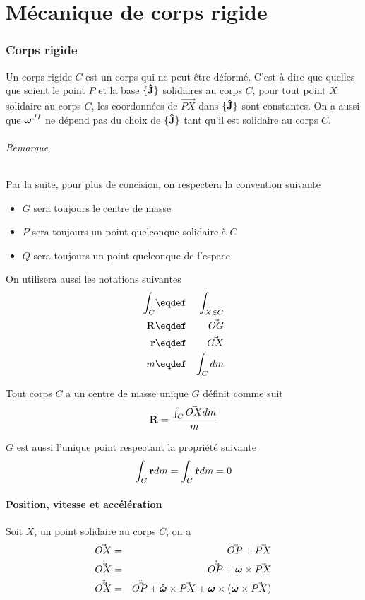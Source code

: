 \part{Mécanique de corps rigide}
\section{Corps rigide}
Un corps rigide $C$ est un corps qui ne peut être déformé.
C'est à dire que quelles que soient le point $P$ et la base $\{{\bf\hat{J}}\}$ solidaires au corps $C$, pour tout point $X$ solidaire au corps $C$, les coordonnées de $\vec{PX}$ dans $\{{\bf\hat{J}}\}$ sont constantes.
On a aussi que ${\bm \omega}^{JI}$ ne dépend pas du choix de $\{{\bf\hat{J}}\}$ tant qu'il est solidaire au corps $C$.

\paragraph{Remarque}
Par la suite, pour plus de concision, on respectera la convention suivante
\begin{itemize}
  \item $G$ sera toujours le centre de masse
  \item $P$ sera toujours un point quelconque solidaire à $C$
  \item $Q$ sera toujours un point quelconque de l'espace
\end{itemize}

On utilisera aussi les notations suivantes
\begin{eqnarray*}
  \int_C &\eqdef& \int_{X \in C}\\
  \xg &\eqdef& \vec{OG}\\
  \fv{r} &\eqdef& \vec{GX}\\
  m &\eqdef& \int_C dm
\end{eqnarray*}

Tout corps $C$ a un centre de masse unique $G$ définit comme suit
\[ {\bf R} = \frac{\int_C \vec{OX} dm}{m} \]

$G$ est aussi l'unique point respectant la propriété suivante
\[ \int_C {\bf r} dm = \int_C \dot{\bf r} dm = 0 \]

\subsection{Position, vitesse et accélération}
Soit $X$, un point solidaire au corps $C$, on a
\begin{eqnarray*}
	\vec{OX} 		&=&	\vec{OP} + \vec{PX}\\
  \dot{\vec{ OX}} 	&=& \dot{\vec{ OP}} + {\bm \omega} \times \vec{PX}\\
  \ddot{\vec{ OX}} 	&=& \ddot{\vec{ OP}} + \mathring{\bm \omega} \times \vec{PX} + {\bm \omega} \times ({\bm \omega} \times \vec{PX})
\end{eqnarray*}

